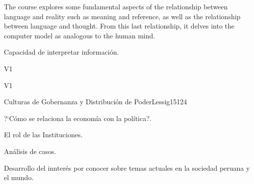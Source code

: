 \begin{syllabus}


\begin{justification}
The course explores some fundamental aspects of the relationship between language and reality such as meaning and reference, as well as the relationship between language and thought. From this last relationship, it delves into the computer model as analogous to the human mind.
\end{justification}

\begin{goals}
\item Capacidad de interpretar información.
\end{goals}

\begin{outcomes}{V1}
    \item {}
    \item {}
    \item {}
    
\end{outcomes}

\begin{competences}{V1}
    \item {}
    \item {}
    \item {}
    \item {}
\end{competences}

\begin{unit}{Culturas de Gobernanza y Distribución de Poder}{}{Lessig15}{12}{4}
   \begin{topics}
      \item ?`Cómo se relaciona la economía con la política?.
      \item El rol de las Instituciones.
      \item Análisis de casos.
   \end{topics}
   \begin{learningoutcomes}
      \item Desarrollo del innterés por conocer sobre temas actuales en la sociedad peruana y el mundo.
   \end{learningoutcomes}
\end{unit}

\begin{coursebibliography}
\end{coursebibliography}

\end{syllabus}
